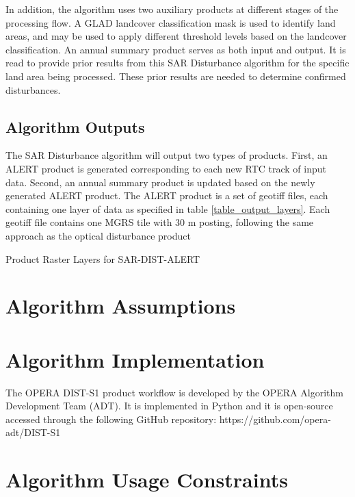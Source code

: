 \documentclass[11pt]{article}
\begin{document}
In addition,
the algorithm uses two auxiliary products at different stages of
the processing flow.
A GLAD landcover classification mask is used to identify land areas,
and may be used to apply different threshold levels based on the landcover
classification.
An annual summary product serves as both input and output.
It is read to provide prior results from
this SAR Disturbance algorithm for the specific land area being processed.
These prior results are needed to determine confirmed disturbances.

\subsection{Algorithm Outputs}

The SAR Disturbance algorithm will output two types of products.
First, an ALERT product is generated corresponding to each new RTC track
of input data.
Second,
an annual summary product is updated based on the newly generated
ALERT product.
The ALERT product is a set of geotiff files,
each containing one layer of data as specified in table
\ref{table_output_layers}.
Each geotiff file contains one MGRS tile with 30 m posting,
following the same approach as the optical disturbance product
\cite{dist_hls_atbd}

\begin{table}[h]
\begin{center}
%
\end{center}
\caption{Product Raster Layers for SAR-DIST-ALERT}
\label{table_output_layers}
\end{table}

\section{Algorithm Assumptions}

\section{Algorithm Implementation}

The OPERA DIST-S1 product workflow is developed by the OPERA
Algorithm Development Team (ADT).
It is implemented in Python and it is open-source accessed through the
following GitHub repository:
\noindent
https://github.com/opera-adt/DIST-S1

\section{Algorithm Usage Constraints}
\end{document}
